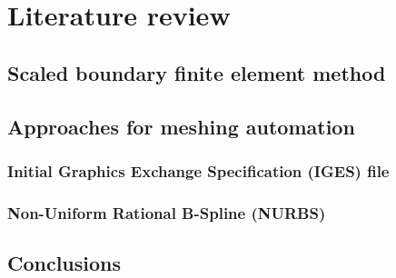 
\chapter{Literature review}





\section{Scaled boundary finite element method}


\section{Approaches for meshing automation}

    \subsection{Initial Graphics Exchange Specification (IGES) file}
    \label{lr_sc:iges}

    \subsection{Non-Uniform Rational B-Spline (NURBS)}
    

\section{Conclusions}